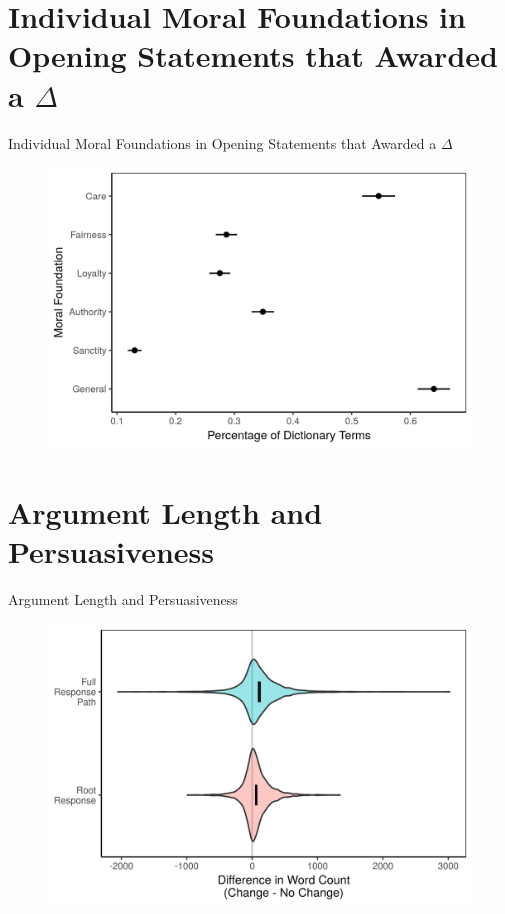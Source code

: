 \documentclass{beamer}
\begin{document}
\section{Individual Moral Foundations in Opening Statements that Awarded a $\Delta$}
\begin{frame}{Individual Moral Foundations in Opening Statements that Awarded a $\Delta$}
\begin{figure}
	\includegraphics{../calc/fig/mft_op_individual.png}
\end{figure}
\end{frame}

\section{Argument Length and Persuasiveness}
\begin{frame}{Argument Length and Persuasiveness}
\begin{figure}
	\includegraphics{../calc/fig/wordcount_violin.png}
\end{figure}
\end{frame}
\end{document}

